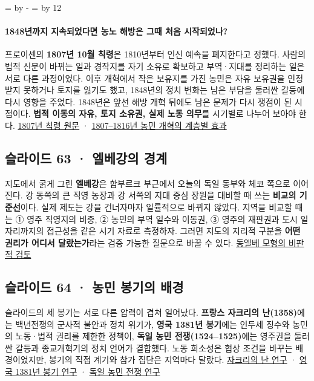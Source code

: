 \documentclass[10pt,a4paper]{article}
\newcommand{\ReserveQuestionSpace}{%
  \par\begingroup
  \dimen0=\pagegoal \advance\dimen0 by -\pagetotal
  \dimen2=\baselineskip \multiply\dimen2 by 12
  \ifdim\dimen0<\dimen2 \newpage\fi
  \endgroup}
\begin{document}
\ReserveQuestionSpace
\paragraph{1848년까지 지속되었다면 농노 해방은 그때 처음 시작되었나?}
프로이센의 \textbf{1807년 10월 칙령}은 1810년부터 인신 예속을 폐지한다고 정했다. 사람의 법적 신분이 바뀌는 일과 경작지를 자기 소유로 확보하고 부역·지대를 정리하는 일은 서로 다른 과정이었다. 이후 개혁에서 작은 보유지를 가진 농민은 자유 보유권을 인정받지 못하거나 토지를 잃기도 했고, 1848년의 정치 변화는 남은 부담을 둘러싼 갈등에 다시 영향을 주었다. 1848년은 앞선 해방 개혁 뒤에도 남은 문제가 다시 쟁점이 된 시점이다. \textbf{법적 이동의 자유, 토지 소유권, 실제 노동 의무}를 시기별로 나누어 보아야 한다. \href{https://germanhistorydocs.org/en/the-holy-roman-empire-1648-1815/ghdi\%3Adocument-3613}{1807년 칙령 원문} · \href{https://hagen.faculty.ucdavis.edu/wp-content/uploads/sites/529/2023/07/Hagen-Polish-and-East-Elbian-German-Peasantries-1500-1800-Scott-ed.-vol.-1998.pdf}{1807–1816년 농민 개혁의 계층별 효과}\par

\subsection{슬라이드 63 · 엘베강의 경계}
지도에서 굵게 그린 \textbf{엘베강}은 함부르크 부근에서 오늘의 독일 동부와 체코 쪽으로 이어진다. 강 동쪽의 큰 직영 농장과 강 서쪽의 지대 중심 장원을 대비할 때 쓰는 \textbf{비교의 기준선}이다. 실제 제도는 강을 건너자마자 일률적으로 바뀌지 않았다. 지역을 비교할 때는 ① 영주 직영지의 비중, ② 농민의 부역 일수와 이동권, ③ 영주의 재판권과 도시 일자리까지의 접근성을 같은 시기 자료로 측정하자. 그러면 지도의 지리적 구분을 \textbf{어떤 권리가 어디서 달랐는가}라는 검증 가능한 질문으로 바꿀 수 있다. \href{https://www.cambridge.org/core/journals/central-european-history/article/abs/gutsherrschaft-in-east-elbian-germany-and-livonia-15001800-a-critique-of-the-model/E75E65E9C9B7B67DE3D56CCAC7CCDCE1}{동엘베 모형의 비판적 검토}\par

\subsection{슬라이드 64 · 농민 봉기의 배경}
슬라이드의 세 봉기는 서로 다른 압력이 겹쳐 일어났다. \textbf{프랑스 자크리의 난(1358)}에는 백년전쟁의 군사적 불안과 정치 위기가, \textbf{영국 1381년 봉기}에는 인두세 징수와 농민의 노동·법적 권리를 제한한 정책이, \textbf{독일 농민 전쟁(1524–1525)}에는 영주권을 둘러싼 갈등과 종교개혁기의 정치 언어가 결합했다. 노동 희소성은 협상 조건을 바꾸는 배경이었지만, 봉기의 직접 계기와 참가 집단은 지역마다 달랐다. \href{https://academic.oup.com/book/39423}{자크리의 난 연구} · \href{https://www.cambridge.org/core/journals/journal-of-british-studies/article/abs/peasants-revolt-and-the-government-of-england/A8D41AAB30C8E2F2689AB7DEEEB412BE}{영국 1381년 봉기 연구} · \href{https://www.cambridge.org/core/books/abs/rural-society-and-the-search-for-order-in-early-modern-germany/peasants-war-and-reformation/6D0C1C313DE999AE441B92E282B0A61A}{독일 농민 전쟁 연구}\par
\end{document}
